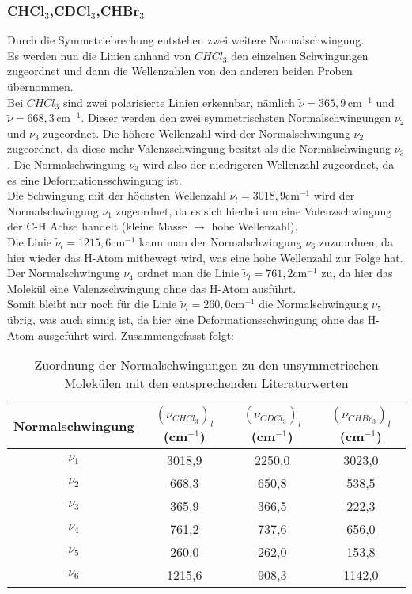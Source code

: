 \subsubsection{CHCl$_3$,CDCl$_3$,CHBr$_3$}
Durch die Symmetriebrechung entstehen zwei weitere Normalschwingung.\\
Es werden nun die Linien anhand von $CHCl_3$ den einzelnen Schwingungen zugeordnet und dann die Wellenzahlen von den anderen beiden Proben übernommen.\\
Bei $CHCl_3$ sind zwei polarisierte Linien erkennbar, nämlich $\tilde{\nu}=365,9\,\text{cm}^{-1}$ und $\tilde{\nu}=668,3\,\text{cm}^{-1}$.
Dieser werden den zwei symmetrischsten Normalschwingungen $\nu_2$ und $\nu_3$ zugeordnet.
Die höhere Wellenzahl wird der Normalschwingung $\nu_2$ zugeordnet, da diese mehr Valenzschwingung besitzt als die Normalschwingung $\nu_3$.
Die Normalschwingung $\nu_3$ wird also der niedrigeren Wellenzahl zugeordnet, da es eine Deformationsschwingung ist.\\
Die Schwingung mit der höchsten Wellenzahl $\tilde{\nu}_l=3018,9\text{cm}^{-1}$ wird der Normalschwingung $\nu_1$ zugeordnet, da es sich hierbei um eine Valenzschwingung der C-H Achse handelt (kleine Masse $\to$ hohe Wellenzahl).\\
Die Linie $\tilde{\nu}_l=1215,6\text{cm}^{-1}$ kann man der Normalschwingung $\nu_6$ zuzuordnen, da hier wieder das H-Atom mitbewegt wird, was eine hohe Wellenzahl zur Folge hat.\\
Der Normalschwingung $\nu_4$ ordnet man die Linie $\tilde{\nu}_l=761,2\text{cm}^{-1}$ zu, da hier das Molekül eine Valenzschwingung ohne das H-Atom ausführt.\\
Somit bleibt nur noch für die Linie $\tilde{\nu}_l=260,0\text{cm}^{-1}$ die Normalschwingung $\nu_5$ übrig, was auch sinnig ist, da hier eine Deformationsschwingung ohne das H-Atom ausgeführt wird.\newpage
Zusammengefasst folgt:
\begin{table}[h]
    \centering\begin{tabular}{c|ccc}
        Normalschwingung & $(\nu_{CHCl_3})_l$ (cm$^{-1}$)& $(\nu_{CDCl_3})_l$ (cm$^{-1}$)& $(\nu_{CHBr_3})_l$ (cm$^{-1}$)\\\hline
        $\nu_1$&3018,9&2250,0&3023,0\\
        $\nu_2$&668,3&650,8&538,5\\
        $\nu_3$&365,9&366,5&222,3\\
        $\nu_4$&761,2&737,6&656,0\\
        $\nu_5$&260,0&262,0&153,8\\
        $\nu_6$&1215,6&908,3&1142,0
    \end{tabular}
    \caption{Zuordnung der Normalschwingungen zu den unsymmetrischen Molekülen mit den entsprechenden Literaturwerten}
\end{table}\\
